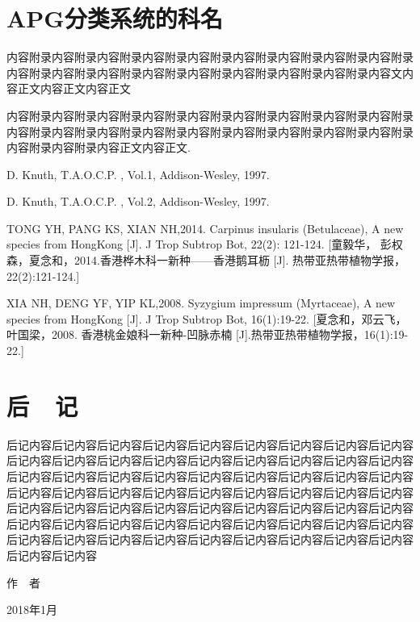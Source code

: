 \documentclass[utf8]{book}
\begin{document}



\appendix


\chapter{APG分类系统的科名}


内容附录内容附录内容附录内容附录内容附录内容附录内容附录内容附录内容附录内容附录内容附录内容附录内容附录内容附录内容附录内容附录内容附录内容文内容正文内容正文内容正文


内容附录内容附录内容附录内容附录内容附录内容附录内容附录内容附录内容附录内容附录内容附录内容附录内容附录内容附录内容附录内容附录内容附录内容附录内容附录内容附录内容正文内容正文\cite{DK1}.


\renewcommand\indexname{索~~引}

\printindex



\backmatter




\begin{thebibliography}{参考文献}

 D. Knuth, T.A.O.C.P. , Vol.1, Addison-Wesley, 1997.

 D. Knuth, T.A.O.C.P. , Vol.2, Addison-Wesley, 1997.

 TONG YH, PANG KS, XIAN NH,2014. Carpinus insularis (Betulaceae), A new species from HongKong [J]. J Trop Subtrop Bot, 22(2): 121-124. [童毅华， 彭权森，夏念和，2014.香港桦木科一新种——香港鹅耳枥 [J]. 热带亚热带植物学报，22(2):121-124.]

 XIA NH, DENG YF, YIP KL,2008. Syzygium impressum (Myrtaceae), A new species from HongKong [J]. J Trop Subtrop Bot, 16(1):19-22. [夏念和，邓云飞，叶国梁，2008. 香港桃金娘科一新种-凹脉赤楠 [J].热带亚热带植物学报，16(1):19-22.]

\end{thebibliography}


\chapter{后~~记}


后记内容后记内容后记内容后记内容后记内容后记内容后记内容后记内容后记内容后记内容后记内容后记内容后记内容后记内容后记内容后记内容后记内容后记内容后记内容后记内容后记内容后记内容后记内容后记内容后记内容后记内容后记内容后记内容后记内容后记内容后记内容后记内容后记内容后记内容后记内容后记内容后记内容后记内容后记内容后记内容后记内容后记内容后记内容后记内容后记内容后记内容后记内容后记内容后记内容后记内容后记内容后记内容后记内容后记内容后记内容后记内容后记内容后记内容后记内容后记内容后记内容后记内容后记内容后记内容后记内容


\begin{flushright}

作~~者~~~~~~~~~


2018年1月~~~~~

\end{flushright}
\end{document}
